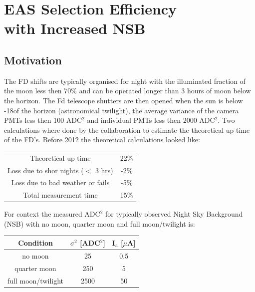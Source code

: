 \chapter[EAS Selection Efficiency with Increased NSB]{\centering EAS Selection Efficiency \\ with Increased NSB \\}\label{Ch:SelectEff}



\section{Motivation}

The FD shifts are typically organised for night with the illuminated fraction of the moon less then 70\% and can be operated longer than 3 hours of moon below the horizon. The Fd telescope shutters are then opened when the sun is below -18\textdegree of the horizon (astronomical twilight), the average variance of the camera PMTs less then 100 ADC$^2$ and individual PMTs less then 2000 ADC$^2$. Two calculations where done by the collaboration to estimate the theoretical up time of the FD's. Before 2012 the theoretical calculations looked like:

\begin{table}[h]
\centering
\begin{tabular}{c c}
Theoretical up time & 22\% \\
Loss due to shor nights ($<$ 3 hrs) & -2\% \\
Loss due to bad weather or fails & -5\% \\ \hline \hline
Total measurement time & 15\% 
\end{tabular}
\end{table}

For context the measured ADC$^2$ for typically observed Night Sky Background (NSB) with no moon, quarter moon and full moon/twilight is:
\begin{table}[h]
\centering
\begin{tabular}{c c c}
\hline\hline
Condition & $\sigma^2$ [ADC$^2$] & I$_{\mathrm{a}}$ [$\mu$A] \\ \hline\hline
no moon & 25 & 0.5 \\
quarter moon & 250 & 5 \\
full moon/twilight & 2500 & 50 \\ \hline\hline
\end{tabular}
\end{table}

